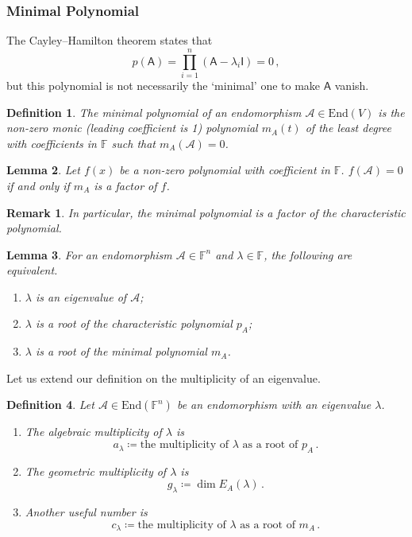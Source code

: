 \documentclass{article}
\theoremstyle{plain}\theoremheaderfont{\normalfont\itshape}\theorembodyfont{\rmfamily}\theoremseparator{.}\newtheorem*{rem}{Remark}\newtheorem*{ex}{Example}\newtheorem*{proof}{Proof}\newtheorem*{altp}{Alternative proof}
\theoremstyle{plain}\theoremheaderfont{\normalfont\bfseries}\theorembodyfont{\rmfamily}\theoremseparator{.}\newtheorem{thm}{Theorem}[section]\newtheorem{lem}[thm]{Lemma}\newtheorem{prop}[thm]{Proposition}\newtheorem*{cor}{Corollary}\newtheorem{defn}[thm]{Definition}\newtheorem{clm}[thm]{Claim}\newtheorem{clminproof}{Claim}
\theoremstyle{break}\theoremheaderfont{\normalfont\itshape}\theorembodyfont{\rmfamily}\theoremseparator{.\medskip}\newtheorem*{proofskip}{Proof}\newtheorem*{exs}{Examples}\newtheorem*{rems}{Remarks}
\theoremstyle{break}\theoremheaderfont{\normalfont\bfseries}\theorembodyfont{\rmfamily}\theoremseparator{.\medskip}\newtheorem{lemskip}[thm]{Lemma}\newtheorem{defnskip}[thm]{Definition}\newtheorem{propskip}[thm]{Proposition}\newtheorem{thmskip}[thm]{Theorem}
\numberwithin{equation}{section}
\begin{document}
	\subsubsection{Minimal Polynomial}
	The Cayley--Hamilton theorem states that
	\[p(\mathsf{A})=\prod_{i=1}^{n}(\mathsf{A}-\lambda_i\mathsf{I})=0\,,\]
	but this polynomial is not necessarily the `minimal' one to make \(\mathsf{A}\) vanish.
	\begin{defn}
		The \textit{minimal polynomial} of an endomorphism \(\mathcal{A}\in\mathrm{End}(V)\) is the non-zero monic (leading coefficient is 1) polynomial \(m_A(t)\) of the least degree with coefficients in \(\mathbb{F}\) such that \(m_A(\mathcal{A})=0\).
	\end{defn}
	\begin{lem}
		Let \(f(x)\) be a non-zero polynomial with coefficient in \(\mathbb{F}\). \(f(\mathcal{A})=0\) if and only if \(m_A\) is a factor of \(f\).
	\end{lem}
	\begin{rem}
		In particular, the minimal polynomial is a factor of the characteristic polynomial.
	\end{rem}
	\begin{lem}
		For an endomorphism \(\mathcal{A}\in\mathbb{F}^n\) and \(\lambda\in\mathbb{F}\), the following are equivalent.
		\begin{enumerate}[topsep=0pt]
			\item \(\lambda\) is an eigenvalue of \(\mathcal{A}\);
			\item \(\lambda\) is a root of the characteristic polynomial \(p_A\);
			\item \(\lambda\) is a root of the minimal polynomial \(m_A\). 
		\end{enumerate}
	\end{lem}
	Let us extend our definition on the multiplicity of an eigenvalue.
	\begin{defn}
		Let \(\mathcal{A}\in\mathrm{End}(\mathbb{F}^n)\) be an endomorphism with an eigenvalue \(\lambda\).
		\begin{enumerate}[topsep=0pt]
			\item The \textit{algebraic multiplicity} of \(\lambda\) is
			\[a_\lambda\coloneqq\text{the multiplicity of }\lambda\text{ as a root of }p_A\,.\]
			\item The \textit{geometric multiplicity} of \(\lambda\) is
			\[g_\lambda\coloneqq\dim E_A(\lambda)\,.\]
			\item Another useful number is
			\[c_\lambda\coloneqq\text{the multiplicity of }\lambda\text{ as a root of }m_A\,.\]
		\end{enumerate}
	\end{defn}
\end{document}
